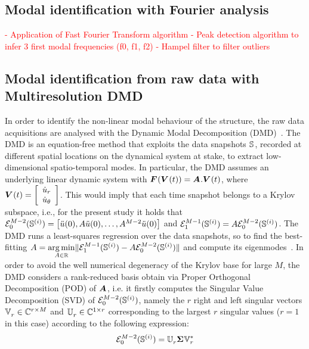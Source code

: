 \documentclass[runningheads]{llncs}
\begin{document}
\subsection{Modal identification with Fourier analysis}
\label{subsec:Modal_identification_Fourier}
\textcolor{red}{
- Application of Fast Fourier Transform algorithm
- Peak detection algorithm to infer 3 first modal frequencies (f0, f1, f2)
- Hampel filter to filter outliers}

\subsection{Modal identification from raw data with Multiresolution DMD}
\label{subsec:Modal_identification_from_raw_data_with_Multiresolution_DMD}
In order to identify the non-linear modal behaviour of the structure, the raw data acquisitions are analysed with the Dynamic Modal Decomposition (DMD)~\cite{Rowley_et_al_2009,Schmid_2010,Schmid_et_al_2011,Tu_et_al_2014}. The DMD is an equation-free method that exploits the data snapshots $\St$, recorded at different spatial locations on the dynamical system at stake, to extract low-dimensional spatio-temporal modes. In particular, the DMD assumes an underlying linear dynamic system with $\Fv(\Vv(t))=\Av.\Vv(t)$, where $\Vv(t)=\bmat[\dot u_r\\ \dot u_\theta][c]$. This would imply that each time snapshot belongs to a Krylov subspace, i.e., for the present study it holds that $\mathcal{E}_0^{M-2}(\St[][(i)])=\psp{\ddot{u}(0),A\ddot{u}(0),\ldots,A^{M-2}\ddot{u}(0)}$ and $\mathcal{E}_1^{M-1}(\St[][(i)])=A\mathcal{E}_0^{M-2}(\St[][(i)])$. The DMD runs a least-squares regression over the data snapshots, so to find the best-fitting $A=\underset{A\in \R}{\arg\min}\norm{\mathcal{E}_1^{M-1}(\St[][(i)])-A\mathcal{E}_0^{M-2}(\St[][(i)])}$ and compute its eigenmodes~\cite{kutz_multiresolution_2016}. In order to avoid the well numerical degeneracy of the Krylov base for large $M$, the DMD considers a rank-reduced basis obtain via Proper Orthogonal Decomposition (POD) of $\Av$, i.e. it firstly computes the Singular Value Decomposition (SVD) of $\mathcal{E}_0^{M-2}(\St[][(i)])$, namely the $r$ right and left singular vectors $\Vt[r]\in\mathbb{C}^{r\times M}$ and $\Ut[r]\in\mathbb{C}^{1\times r}$ corresponding to the largest $r$ singular values ($r=1$ in this case) according to the following expression:
\begin{equation}
    \mathcal{E}_0^{M-2}(\St[][(i)])=\Ut[r]\Sigmat\Vt[r][*]
    \label{eq:svd}
\end{equation}
\end{document}
